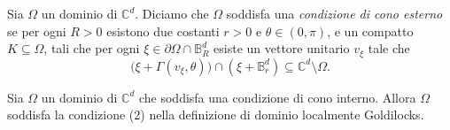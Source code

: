 \begin{defn}
    Sia $\Omega$ un dominio di $\mathbb{C}^d$. Diciamo che $\Omega$ soddisfa una \textit{condizione di cono esterno} se per ogni $R>0$ esistono due costanti $r>0$ e $\theta\in(0,\pi)$, e un compatto $K\subseteq\Omega$, tali che per ogni $\xi\in\partial\Omega\cap\mathbb{B}^d_R$ esiste un vettore unitario $v_\xi$ tale che
    $$\big(\xi+\Gamma(v_\xi,\theta)\big)\cap (\xi+\mathbb{B}^d_r)\subseteq\mathbb{C}^d\setminus\Omega.$$
\end{defn}

\begin{lm} \label{conin}
    Sia $\Omega$ un dominio di $\mathbb{C}^d$ che soddisfa una condizione di cono interno. Allora $\Omega$ soddisfa la condizione (2) nella definizione di dominio localmente Goldilocks.
\end{lm}

